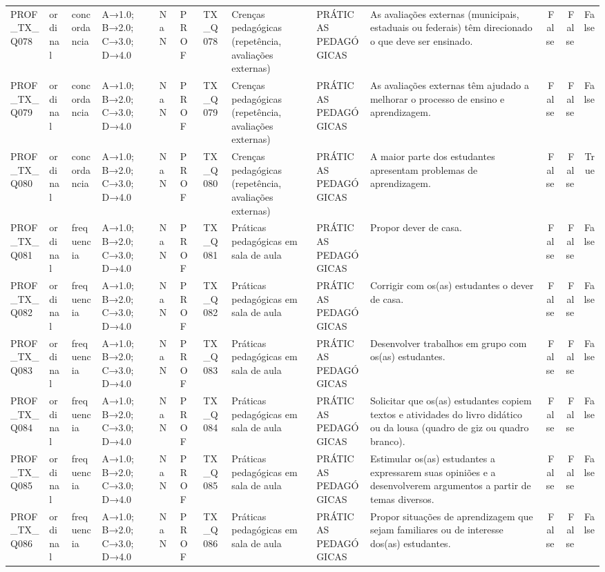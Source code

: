 \begin{tabular}{llllllllllrrr}
PROF\_TX\_Q078 & ordinal & concordancia & A→1.0; B→2.0; C→3.0; D→4.0 & NaN & PROF & TX\_Q078 & Crenças pedagógicas (repetência, avaliações externas) & PRÁTICAS PEDAGÓGICAS & As avaliações externas (municipais, estaduais ou federais) têm direcionado o que deve ser ensinado. & False & False & False \\
PROF\_TX\_Q079 & ordinal & concordancia & A→1.0; B→2.0; C→3.0; D→4.0 & NaN & PROF & TX\_Q079 & Crenças pedagógicas (repetência, avaliações externas) & PRÁTICAS PEDAGÓGICAS & As avaliações externas têm ajudado a melhorar o processo de ensino e aprendizagem. & False & False & False \\
PROF\_TX\_Q080 & ordinal & concordancia & A→1.0; B→2.0; C→3.0; D→4.0 & NaN & PROF & TX\_Q080 & Crenças pedagógicas (repetência, avaliações externas) & PRÁTICAS PEDAGÓGICAS & A maior parte dos estudantes apresentam problemas de aprendizagem. & False & False & True \\
PROF\_TX\_Q081 & ordinal & frequencia & A→1.0; B→2.0; C→3.0; D→4.0 & NaN & PROF & TX\_Q081 & Práticas pedagógicas em sala de aula & PRÁTICAS PEDAGÓGICAS & Propor dever de casa. & False & False & False \\
PROF\_TX\_Q082 & ordinal & frequencia & A→1.0; B→2.0; C→3.0; D→4.0 & NaN & PROF & TX\_Q082 & Práticas pedagógicas em sala de aula & PRÁTICAS PEDAGÓGICAS & Corrigir com os(as) estudantes o dever de casa. & False & False & False \\
PROF\_TX\_Q083 & ordinal & frequencia & A→1.0; B→2.0; C→3.0; D→4.0 & NaN & PROF & TX\_Q083 & Práticas pedagógicas em sala de aula & PRÁTICAS PEDAGÓGICAS & Desenvolver trabalhos em grupo com os(as) estudantes. & False & False & False \\
PROF\_TX\_Q084 & ordinal & frequencia & A→1.0; B→2.0; C→3.0; D→4.0 & NaN & PROF & TX\_Q084 & Práticas pedagógicas em sala de aula & PRÁTICAS PEDAGÓGICAS & Solicitar que os(as) estudantes copiem textos e atividades do livro didático ou da lousa (quadro de giz ou quadro branco). & False & False & False \\
PROF\_TX\_Q085 & ordinal & frequencia & A→1.0; B→2.0; C→3.0; D→4.0 & NaN & PROF & TX\_Q085 & Práticas pedagógicas em sala de aula & PRÁTICAS PEDAGÓGICAS & Estimular os(as) estudantes a expressarem suas opiniões e a desenvolverem argumentos a partir de temas diversos. & False & False & False \\
PROF\_TX\_Q086 & ordinal & frequencia & A→1.0; B→2.0; C→3.0; D→4.0 & NaN & PROF & TX\_Q086 & Práticas pedagógicas em sala de aula & PRÁTICAS PEDAGÓGICAS & Propor situações de aprendizagem que sejam familiares ou de interesse dos(as) estudantes. & False & False & False \\

\end{tabular}
